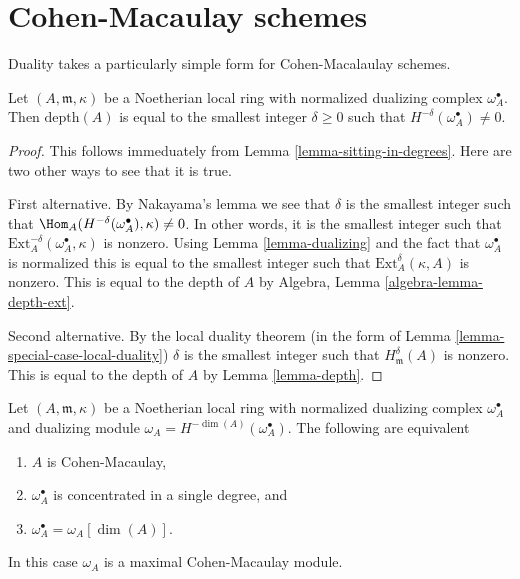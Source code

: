\section{Cohen-Macaulay schemes}
\label{section-CM}

\noindent
Duality takes a particularly simple form for Cohen-Macalaulay schemes.

\begin{lemma}
\label{lemma-depth-in-terms-dualizing-complex}
Let $(A, \mathfrak m, \kappa)$ be a Noetherian local ring with
normalized dualizing complex $\omega_A^\bullet$.
Then $\text{depth}(A)$ is equal to the smallest integer $\delta \geq 0$
such that $H^{-\delta}(\omega_A^\bullet) \not = 0$.
\end{lemma}

\begin{proof}
This follows immeduately from Lemma \ref{lemma-sitting-in-degrees}.
Here are two other ways to see that it is true.

\medskip\noindent
First alternative. By Nakayama's lemma we see that
$\delta$ is the smallest integer such that
$\Hom_A(H^{-\delta}(\omega_A^\bullet), \kappa) \not = 0$.
In other words, it is the smallest integer such that
$\text{Ext}_A^{-\delta}(\omega_A^\bullet, \kappa)$
is nonzero. Using Lemma \ref{lemma-dualizing} and the fact that
$\omega_A^\bullet$ is normalized this is equal to the
smallest integer such that $\text{Ext}_A^\delta(\kappa, A)$ is
nonzero. This is equal to the depth of $A$ by
Algebra, Lemma \ref{algebra-lemma-depth-ext}.

\medskip\noindent
Second alternative. By the local duality theorem
(in the form of Lemma \ref{lemma-special-case-local-duality})
$\delta$ is the smallest integer such that $H^\delta_\mathfrak m(A)$
is nonzero. This is equal to the depth of $A$ by
Lemma \ref{lemma-depth}.
\end{proof}

\begin{lemma}
\label{lemma-apply-CM}
Let $(A, \mathfrak m, \kappa)$ be a Noetherian local ring
with normalized dualizing complex $\omega_A^\bullet$
and dualizing module $\omega_A = H^{-\dim(A)}(\omega_A^\bullet)$.
The following are equivalent
\begin{enumerate}
\item $A$ is Cohen-Macaulay,
\item $\omega_A^\bullet$ is concentrated in a single degree, and
\item $\omega_A^\bullet = \omega_A[\dim(A)]$.
\end{enumerate}
In this case $\omega_A$ is a maximal Cohen-Macaulay module.
\end{lemma}

